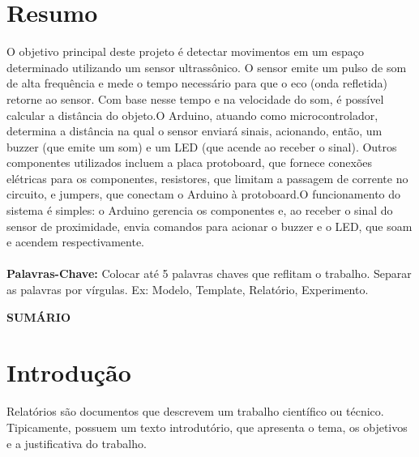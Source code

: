 \documentclass[a4paper,12pt]{article}
\begin{document}
\section*{Resumo}
\label{sec:resumo}

O objetivo principal deste projeto é detectar movimentos em um espaço determinado utilizando um sensor ultrassônico. O sensor emite um pulso de som de alta frequência e mede o tempo necessário para que o eco (onda refletida) retorne ao sensor. Com base nesse tempo e na velocidade do som, é possível calcular a distância do objeto.O Arduino, atuando como microcontrolador, determina a distância na qual o sensor enviará sinais, acionando, então, um buzzer (que emite um som) e um LED (que acende ao receber o sinal). Outros componentes utilizados incluem a placa protoboard, que fornece conexões elétricas para os componentes, resistores, que limitam a passagem de corrente no circuito, e jumpers, que conectam o Arduino à protoboard.O funcionamento do sistema é simples: o Arduino gerencia os componentes e, ao receber o sinal do sensor de proximidade, envia comandos para acionar o buzzer e o LED, que soam e acendem respectivamente.   \\ \\

\textbf{Palavras-Chave: }Colocar até 5 palavras chaves que reflitam o trabalho. Separar as palavras por vírgulas.
Ex: Modelo, Template, Relatório, Experimento.

\newpage
\begin{center}
    {\LARGE \textbf{SUMÁRIO}} %
\end{center}
\vspace{1cm}

\begingroup
    \hypersetup{hidelinks}
    \renewcommand{\contentsname}{} %
    \tableofcontents
\endgroup


\newpage
\section{Introdução}
\label{sec:introd}
Relatórios são documentos que descrevem um trabalho científico ou técnico. Tipicamente, possuem um
texto introdutório, que apresenta o tema, os objetivos e a justificativa do trabalho. 
\end{document}
